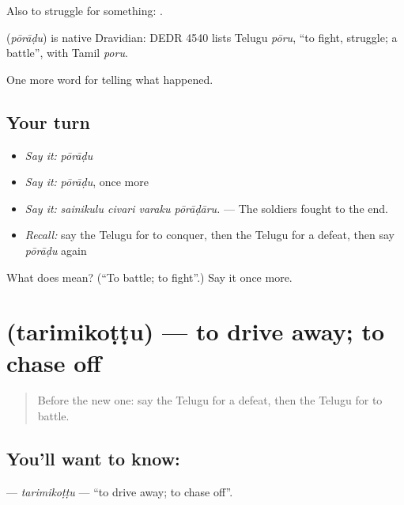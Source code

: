 Also to struggle for something:   .

\begin{cousinweb}
\textbf{} (\emph{pōrāḍu}) is native Dravidian: DEDR 4540 lists Telugu \emph{pōru}, \textquotedblleft{}to fight, struggle; a battle\textquotedblright{}, with Tamil \emph{poru}.
\end{cousinweb}

\begin{grammarlens}[title={What you've built}]
One more word for telling what happened.
\end{grammarlens}

\subsection*{Your turn}
\begin{itemize}
\raggedright
  \item \emph{Say it:} \emph{pōrāḍu}
  \item \emph{Say it:} \emph{pōrāḍu}, once more
  \item \emph{Say it:} \emph{sainikulu civari varaku pōrāḍāru.} — The soldiers fought to the end.
  \item \emph{Recall:} say the Telugu for to conquer, then the Telugu for a defeat, then say \emph{pōrāḍu} again
\end{itemize}

\begin{tcolorbox}[breakable,colback=teal!4,colframe=teal!35!black,title={Before you move on}]
What does  mean? (\textquotedblleft{}To battle; to fight\textquotedblright{}.) Say it once more.
\end{tcolorbox}
\section[\texorpdfstring{\te{తరిమికొట్టు} (tarimikoṭṭu)}{తరిమికొట్టు (tarimikoṭṭu)}]{ (tarimikoṭṭu) — to drive away; to chase off}

\label{lesson:TE-C362-tarimikottu}



\begin{quote}
Before the new one: say the Telugu for a defeat, then the Telugu for to battle.
\end{quote}

\subsection*{You'll want to know: }
\textbf{} — \emph{tarimikoṭṭu} — \textquotedblleft{}to drive away; to chase off\textquotedblright{}.

